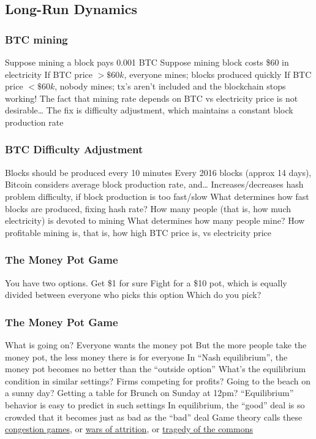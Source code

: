 \documentclass[aspectratio=169]{beamer}
\begin{document}
\subsection{Long-Run Dynamics}




\begin{frame}
\frametitle{BTC mining}

\bi
\m Suppose mining a block pays 0.001 BTC
\m Suppose mining block costs \$60 in electricity
\bi
\m If BTC price $>\$60k$, everyone mines; blocks produced quickly
\m If BTC price $<\$60k$, nobody mines; tx's aren't included and the blockchain stops working!
\ei
\m The fact that mining rate depends on BTC vs electricity price is not desirable\ldots
\m The fix is difficulty adjustment, which maintains a constant block production rate
\ei

\end{frame}

\begin{frame}
\frametitle{BTC Difficulty Adjustment}

\bi
\m Blocks should be produced every 10 minutes
\m Every 2016 blocks (approx 14 days), Bitcoin considers average block production rate, and\ldots
\bi
\m Increases/decreases hash problem difficulty, if block production is too fast/slow
\ei
\m What determines how fast blocks are produced, fixing hash rate? \pause
\bi
\m How many people (that is, how much electricity) is devoted to mining
\ei \pause
\m What determines how many people mine?
\bi
\m How profitable mining is, that is, how high BTC price is, vs electricity price
\ei
\ei

\end{frame}




\begin{frame}
\frametitle{The Money Pot Game}

\bi
\m You have two options.
\be
\m Get \$1 for sure
\m Fight for a \$10 pot, which is equally divided between everyone who picks this option
\ee \pause
\m Which do you pick?
\ei

\end{frame}

\begin{frame}
\frametitle{The Money Pot Game}

\bi
\m What is going on?
\bi
\m Everyone wants the money pot
\m But the more people take the money pot, the less money there is for everyone
\m In ``Nash equilibrium'', the money pot becomes no better than the ``outside option''
\ei \pause
\m What's the equilibrium condition in similar settings?
\bi
\m Firms competing for profits? \pause
\m Going to the beach on a sunny day? 
\m Getting a table for Brunch on Sunday at 12pm? 
\ei
\m ``Equilibrium'' behavior is easy to predict in such settings
\bi
\m In equilibrium, the ``good'' deal is so crowded that it becomes just as bad as the ``bad'' deal
\ei 
\m Game theory calls these \ul{congestion games}, or \ul{wars of attrition}, or \ul{tragedy of the commons}
\ei

\end{frame}
\end{document}
